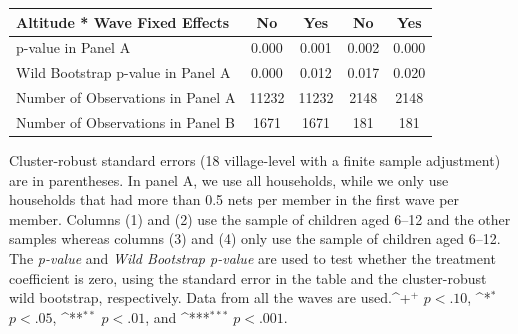 \documentclass[fleqn,11pt]{article}
\newcommand{\sym}[1]{\rlap{$#1$}}
\def\sym#1{\ifmmode^{#1}\else\(^{#1}\)\fi
}
\begin{document}
\begin{table}[h]
\begin{adjustbox}{max width=\textwidth}
\begin{threeparttable}
\begin{tabular}{l*{4}{c}}
Altitude * Wave Fixed Effects&          No         &          Yes         &        No         &         Yes     \\
\hline
 p-value in Panel A                   &       0.000         &       0.001         &       0.002         &       0.000         \\
Wild Bootstrap p-value in Panel A&       0.000         &       0.012         &       0.017         &       0.020         \\
Number of Observations in Panel A       &       11232         &       11232         &        2148         &        2148         \\
Number of Observations in Panel B        &        1671         &        1671         &         181         &         181         \\

\hline\hline
\end{tabular}
\begin{tablenotes}
\item Cluster-robust standard errors (18 village-level with a finite sample adjustment) are in parentheses. In panel A, we use all households, while we only use households that had more than 0.5 nets per member in the first wave per member. Columns (1) and (2) use the sample of children aged 6--12 and the other samples whereas columns (3) and (4) only use the sample of children aged 6--12. The \textit{p-value} and \textit{Wild Bootstrap p-value} are used to test whether the treatment coefficient is zero, using the standard error in the table and the cluster-robust wild bootstrap, respectively. Data from all the waves are used.\sym{+} \(p<.10\), \sym{*} \(p<.05\), \sym{**} \(p<.01\), and \sym{***} \(p<.001\). \end{tablenotes}
\end{threeparttable}
\end{adjustbox}
\end{table}
\end{document}
